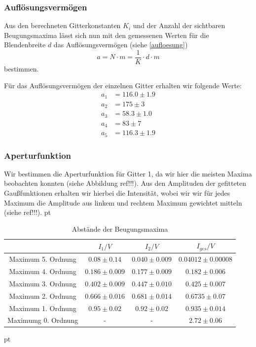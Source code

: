 \documentclass[12pt]{article}
\begin{document}
\subsubsection{Auflösungsvermögen}

Aus den berechneten Gitterkonstanten $K_i$ und der Anzahl der sichtbaren Beugungsmaxima lässt sich nun mit den gemessenen Werten für die Blendenbreite $d$ das Auflösungsvermögen (siehe \ref{aufloesung}) $$a=N\cdot m=\frac1K\cdot d\cdot m$$ bestimmen.

Für das Auflösungsvermögen der einzelnen Gitter erhalten wir folgende Werte:
\begin{align}
	a_1&=116.0\pm1.9\\
	a_2&=175\pm3\\
	a_3&=58.3\pm1.0\\
	a_4&=83\pm7\\
	a_5&=116.3\pm1.9
\end{align}

\subsubsection{Aperturfunktion}


Wir bestimmen die Aperturfunktion für Gitter 1, da wir hier die meisten Maxima beobachten konnten (siehe Abbildung ref!!!).
Aus den Amplituden der gefitteten  Gaußfunktionen erhalten wir hierbei die Intensität, wobei wir wir für jedes Maximum die Amplitude aus linkem und rechtem Maximum gewichtet mitteln (siehe ref!!!). 
  pt
 \begin{table}[h!]
 {\centering
\begin{tabular}{c||c|c|c}
 					& $I_1/V$ 	& $I_2/V$ & $I_{ges}/V$	\\ \hline\hline
Maximum 5. Ordnung     & $0.08 \pm 0.14$  & $0.040 \pm 0.009$      &  $0.04012 \pm  0.00008$                       \\ \hline
Maximum 4. Ordnung		& $0.186 \pm 0.009$ 	&  $0.177 \pm 0.009$    	&  $0.182 \pm 0.006$ \\ \hline 
Maximum 3. Ordnung	&	 $0.402 \pm 0.009$ 	   	&  $0.447 \pm 0.010$  	&  $0.425 \pm 0.007$  \\ \hline
Maximum 2. Ordnung    & $0.666 \pm 0.016$ & $0.681 \pm 0.014$ &   $0.6735 \pm 0.07$        \\ \hline                                           
Maximum 1. Ordnung      	&  $0.95 \pm 0.02$  	&  $0.92 \pm 0.02$  &  $0.935 \pm 0.014$  \\ \hline

Maximumg 0. Ordnung  & -  & - & $2.72 \pm 0.06$
 \end{tabular}
 \caption{Abstände der Beugungsmaxima}}
\end{table}
 pt
\end{document}
